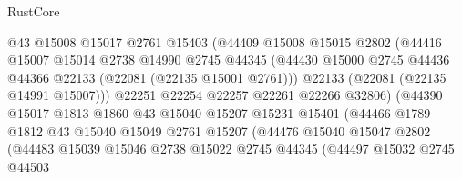 \begin{lexlean}{RustCore}
\begin{coremodule}
                              @43
                              @15008
                              @15017
                              @2761
                              @15403
                              (@44409
                                @15008
                                @15015
                                @2802
                                (@44416
                                  @15007
                                  @15014
                                  @2738
                                  @14990
                                  @2745
                                  @44345
                                  (@44430
                                    @15000
                                    @2745
                                    @44436
                                    @44366
                                    @22133
                                    (@22081 (@22135 @15001 @2761)))
                                  @22133
                                  (@22081 (@22135 @14991 @15007)))
                                @22251
                                @22254
                                @22257
                                @22261
                                @22266
                                @32806)
                              (@44390
                                @15017
                                @1813
                                @1860
                                @43
                                @15040
                                @15207
                                @15231
                                @15401
                                (@44466
                                  @1789
                                  @1812
                                  @43
                                  @15040
                                  @15049
                                  @2761
                                  @15207
                                  (@44476
                                    @15040
                                    @15047
                                    @2802
                                    (@44483
                                      @15039
                                      @15046
                                      @2738
                                      @15022
                                      @2745
                                      @44345
                                      (@44497
                                        @15032
                                        @2745
                                        @44503

\end{coremodule}
\end{lexlean}

